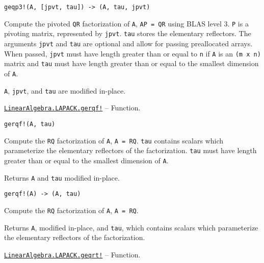 \begin{adjustwidth}{2em}{0pt}


\begin{verbatim}
geqp3!(A, [jpvt, tau]) -> (A, tau, jpvt)
\end{verbatim}

Compute the pivoted \texttt{QR} factorization of \texttt{A}, \texttt{AP = QR} using BLAS level 3. \texttt{P} is a pivoting matrix, represented by \texttt{jpvt}. \texttt{tau} stores the elementary reflectors. The arguments \texttt{jpvt} and \texttt{tau} are optional and allow for passing preallocated arrays. When passed, \texttt{jpvt} must have length greater than or equal to \texttt{n} if \texttt{A} is an \texttt{(m x n)} matrix and \texttt{tau} must have length greater than or equal to the smallest dimension of \texttt{A}.

\texttt{A}, \texttt{jpvt}, and \texttt{tau} are modified in-place.



\end{adjustwidth}
\hypertarget{1345086231036394133}{}
\hyperlink{1345086231036394133}{\texttt{LinearAlgebra.LAPACK.gerqf!}}  -- {Function.}

\begin{adjustwidth}{2em}{0pt}


\begin{verbatim}
gerqf!(A, tau)
\end{verbatim}

Compute the \texttt{RQ} factorization of \texttt{A}, \texttt{A = RQ}. \texttt{tau} contains scalars which parameterize the elementary reflectors of the factorization. \texttt{tau} must have length greater than or equal to the smallest dimension of \texttt{A}.

Returns \texttt{A} and \texttt{tau} modified in-place.




\begin{lstlisting}
gerqf!(A) -> (A, tau)
\end{lstlisting}

Compute the \texttt{RQ} factorization of \texttt{A}, \texttt{A = RQ}.

Returns \texttt{A}, modified in-place, and \texttt{tau}, which contains scalars which parameterize the elementary reflectors of the factorization.



\end{adjustwidth}
\hypertarget{6324071823423584289}{}
\hyperlink{6324071823423584289}{\texttt{LinearAlgebra.LAPACK.geqrt!}}  -- {Function.}

